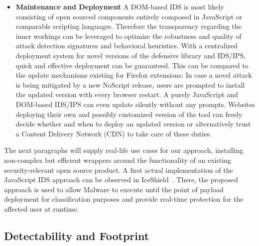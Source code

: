 \begin{itemize}
	\item \textbf{Maintenance and Deployment} A DOM-based IDS is most likely consisting of open sourced components entirely composed in JavaScript or comparable scripting languages. Therefore the transparency regarding the inner workings can be leveraged to optimize the robustness and quality of attack detection signatures and behavioral heuristics. With a centralized deployment system for novel versions of the defensive library and IDS/IPS, quick and effective deployment can be guaranteed. This can be compared to the update mechanisms existing for Firefox extensions: In case a novel attack is being mitigated by a new NoScript release, users are prompted to install the updated version with every browser restart. A purely JavaScript and DOM-based IDS/IPS can even update silently without any prompts. Websites deploying their own and possibly customized version of the tool can freely decide whether and when to deploy an updated version or alternatively trust a Content Delivery Network (CDN) to take care of these duties.
      \end{itemize}

    The next paragraphs will supply real-life use cases for our approach, installing non-complex but efficient wrappers around the functionality of an existing security-relevant open source product. A first actual implementation of the JavaScript IDS approach can be observed in IceShield~\cite{heiderich2011iceshield}. There, the proposed approach is used to allow Malware to execute until the point of payload deployment for classification purposes and provide real-time protection for the affected user at runtime. 



    \subsection{Detectability and Footprint}
    \label{subsubsec:6.6.7.detectability_and_footprint}

